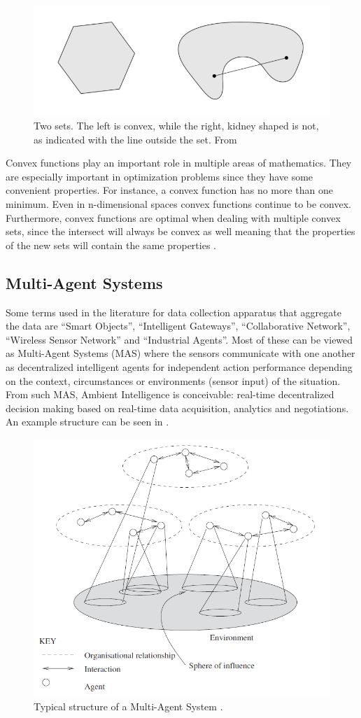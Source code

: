 \begin{figure}
	\centering
	\includegraphics[width=0.7\linewidth]{img/convex}
	\caption{Two sets. The left is convex, while the right, kidney shaped is not, as indicated with the line outside the set. From \citep{boyd2004convex}}
	\label{fig:convex}
\end{figure}


Convex functions play an important role in multiple areas of mathematics. They are especially important in optimization problems since they have some convenient properties. For instance, a convex function has no more than one minimum. Even in n-dimensional spaces convex functions continue to be convex. Furthermore, convex functions are optimal when dealing with multiple convex sets, since the intersect will always be convex as well meaning that the properties of the new sets will contain the same properties  \citep{boyd2004convex}. 
\subsection{Multi-Agent Systems}

Some terms used in the literature for data collection apparatus that aggregate the data are ``Smart Objects'', ``Intelligent Gateways'', ``Collaborative Network'', ``Wireless Sensor Network'' and ``Industrial Agents''. Most of these can be viewed as Multi-Agent Systems (MAS) where the sensors communicate with one another as decentralized intelligent agents for independent action performance depending on the context, circumstances or environments (sensor input) of the situation. From such MAS, Ambient Intelligence  is conceivable: real-time decentralized decision making based on real-time data acquisition, analytics and negotiations. An example structure can be seen in .

\begin{figure}[h]
	\centering
	\includegraphics[width=0.7\linewidth]{./img/MAS_example}
	\caption{Typical structure of a Multi-Agent System \citep{wooldridge2009introduction}.}
	\label{fig:MAS_example}
\end{figure}


